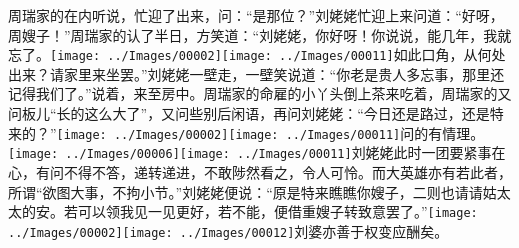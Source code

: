 周瑞家的在内听说，忙迎了出来，问：``是那位？''刘姥姥忙迎上来问道：``好呀，周嫂子！''周瑞家的认了半日，方笑道：``刘姥姥，你好呀！你说说，能几年，我就忘了。{\texttt{[image: ../Images/00002]}\texttt{[image: ../Images/00011]}\footnotesize \kaishu 如此口角，从何处出来？}请家里来坐罢。''刘姥姥一壁走，一壁笑说道：``你老是贵人多忘事，那里还记得我们了。''说着，来至房中。周瑞家的命雇的小丫头倒上茶来吃着，周瑞家的又问板儿``长的这么大了''，又问些别后闲语，再问刘姥姥：``今日还是路过，还是特来的？''{{\texttt{[image: ../Images/00002]}\texttt{[image: ../Images/00011]}\footnotesize \kaishu 问的有情理。　}\texttt{[image: ../Images/00006]}\texttt{[image: ../Images/00011]}\footnotesize \kaishu 刘姥姥此时一团要紧事在心，有问不得不答，递转递进，不敢陟然看之，令人可怜。而大英雄亦有若此者，所谓``欲图大事，不拘小节。''}刘姥姥便说：``原是特来瞧瞧你嫂子，二则也请请姑太太的安。若可以领我见一见更好，若不能，便借重嫂子转致意罢了。''{\texttt{[image: ../Images/00002]}\texttt{[image: ../Images/00012]}\footnotesize \kaishu 刘婆亦善于权变应酬矣。}


